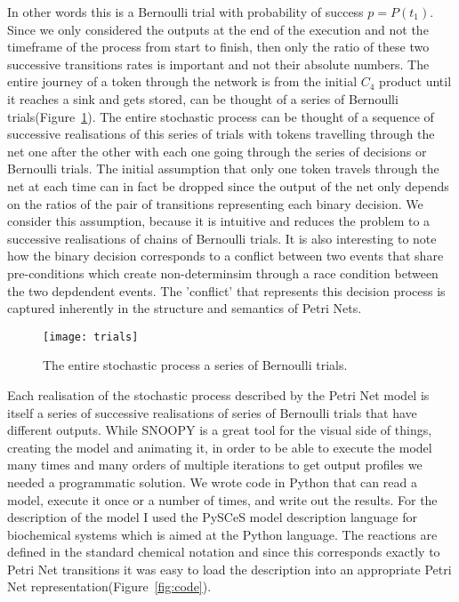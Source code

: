 In other words this is a Bernoulli trial with probability of success
$p = P(t_1)$. Since we only considered the outputs at the end of the
execution and not the timeframe of the process from start to finish,
then only the ratio of these two successive transitions rates is
important and not their absolute numbers. The entire journey of a token through the network
is from the initial $C_4$ product until it reaches a sink and gets stored,
can be thought of a series of Bernoulli
trials(Figure~\ref{fig:trials}). The entire stochastic process
can be thought of a sequence of successive realisations of this series
of trials with tokens travelling through the net one
after the other with each one going through the series of decisions
or Bernoulli trials. The initial assumption that only one token
travels through the net at each time can in fact be dropped since the
output of the net only depends on the ratios of the pair of
transitions representing each binary decision. We consider this assumption, because it is intuitive and reduces the  problem to a successive realisations
of chains of Bernoulli trials.
It is also interesting to note how the binary decision
corresponds to a conflict between two events that share pre-conditions
which create non-determinsim through a race condition between the two
depdendent events. The 'conflict' that represents this decision
process is captured inherently in the structure and semantics of Petri
Nets.

\begin{figure}[htbp!]
\centering
\texttt{[image: trials]}
\caption[Stochastic proces as a series of Bernoulli trials]{The entire
stochastic process a series of Bernoulli trials.}
\label{fig:trials}
\end{figure}

Each realisation of the stochastic process described by the Petri Net
model is itself a series of successive realisations of series of
Bernoulli trials that have different outputs. While SNOOPY is a great
tool for the visual side of things, creating the model and animating
it, in order to be able to execute the model many times and many
orders of multiple iterations to get
output profiles we needed a programmatic solution. We wrote code in
Python that can read a model, execute it once or a number of times, and write
out the results. For the description of the model I used the PySCeS
model description language for biochemical systems which is aimed at
the Python language. The reactions are
defined in the standard chemical notation and since this corresponds
exactly to Petri Net transitions it was easy to load the description
into an appropriate Petri Net representation(Figure~\ref{fig:code}).

